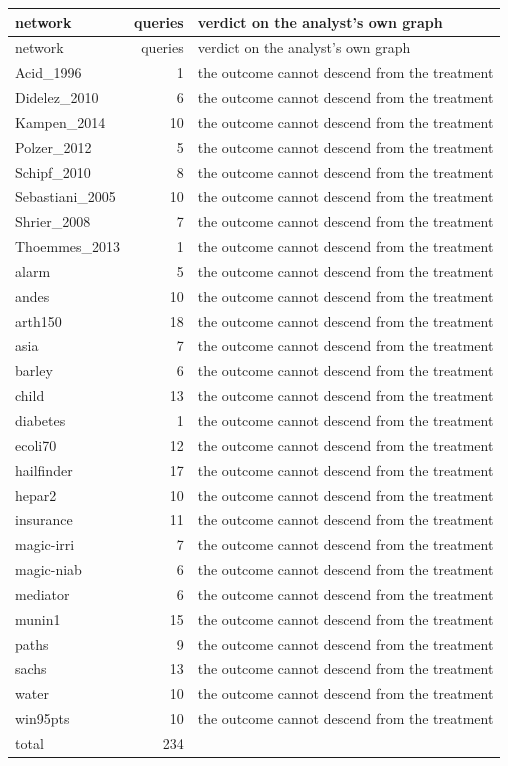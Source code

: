 \begingroup\footnotesize
\setlength{\tabcolsep}{5pt}
\begin{longtable}{@{}lrl@{}}
\toprule
network & queries & verdict on the analyst's own graph \\
\midrule
\endfirsthead
\toprule
network & queries & verdict on the analyst's own graph \\
\midrule
\endhead
\bottomrule
\endlastfoot
Acid\_1996 & 1 & the outcome cannot descend from the treatment \\
Didelez\_2010 & 6 & the outcome cannot descend from the treatment \\
Kampen\_2014 & 10 & the outcome cannot descend from the treatment \\
Polzer\_2012 & 5 & the outcome cannot descend from the treatment \\
Schipf\_2010 & 8 & the outcome cannot descend from the treatment \\
Sebastiani\_2005 & 10 & the outcome cannot descend from the treatment \\
Shrier\_2008 & 7 & the outcome cannot descend from the treatment \\
Thoemmes\_2013 & 1 & the outcome cannot descend from the treatment \\
alarm & 5 & the outcome cannot descend from the treatment \\
andes & 10 & the outcome cannot descend from the treatment \\
arth150 & 18 & the outcome cannot descend from the treatment \\
asia & 7 & the outcome cannot descend from the treatment \\
barley & 6 & the outcome cannot descend from the treatment \\
child & 13 & the outcome cannot descend from the treatment \\
diabetes & 1 & the outcome cannot descend from the treatment \\
ecoli70 & 12 & the outcome cannot descend from the treatment \\
hailfinder & 17 & the outcome cannot descend from the treatment \\
hepar2 & 10 & the outcome cannot descend from the treatment \\
insurance & 11 & the outcome cannot descend from the treatment \\
magic-irri & 7 & the outcome cannot descend from the treatment \\
magic-niab & 6 & the outcome cannot descend from the treatment \\
mediator & 6 & the outcome cannot descend from the treatment \\
munin1 & 15 & the outcome cannot descend from the treatment \\
paths & 9 & the outcome cannot descend from the treatment \\
sachs & 13 & the outcome cannot descend from the treatment \\
water & 10 & the outcome cannot descend from the treatment \\
win95pts & 10 & the outcome cannot descend from the treatment \\
\midrule total & 234 & \\
\end{longtable}
\endgroup
